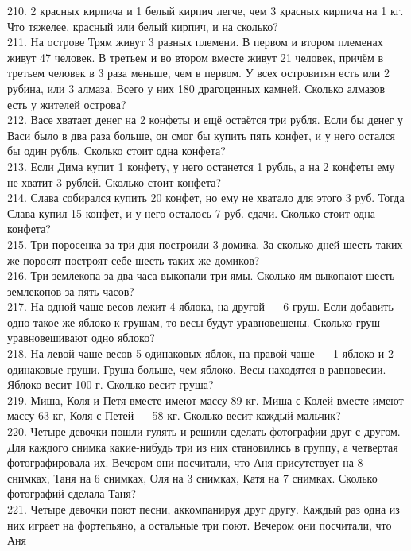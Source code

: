 \documentclass[12pt]{article}
\begin{document}
210. 2 красных кирпича и 1 белый кирпич легче, чем 3 красных кирпича на 1 кг. Что тяжелее, красный или белый кирпич, и на сколько?\\
211. На острове Трям живут 3 разных племени. В первом и втором племенах живут 47 человек. В третьем и во втором вместе живут 21 человек, причём в третьем человек в 3 раза меньше, чем в первом. У всех островитян есть или 2 рубина, или 3 алмаза. Всего у них 180 драгоценных камней. Сколько алмазов есть у жителей острова?\\
212. Васе хватает денег на 2 конфеты и ещё остаётся три рубля. Если бы денег у Васи было в два раза больше, он смог бы купить пять конфет, и у него остался бы один рубль. Сколько стоит одна конфета?\\
213. Если Дима купит 1 конфету, у него останется 1 рубль, а на 2 конфеты ему не хватит 3 рублей. Сколько стоит конфета?\\
214. Слава собирался купить 20 конфет, но ему не хватало для этого 3 руб. Тогда Слава купил 15 конфет, и у него осталось 7 руб. сдачи. Сколько стоит одна конфета?\\
215. Три поросенка за три дня построили 3 домика. За сколько дней шесть таких же поросят построят себе шесть таких же домиков?\\
216. Три землекопа за два часа выкопали три ямы. Сколько ям выкопают шесть землекопов за пять часов?\\
217. На одной чаше весов лежит 4 яблока, на другой --- 6 груш. Если добавить одно такое же яблоко к грушам, то весы будут уравновешены. Сколько груш уравновешивают одно яблоко?\\
218. На левой чаше весов 5 одинаковых яблок, на правой чаше --- 1 яблоко и 2 одинаковые груши. Груша больше, чем яблоко. Весы находятся в равновесии. Яблоко весит 100 г. Сколько весит груша?\\
219. Миша, Коля и Петя вместе имеют массу 89 кг. Миша с Колей вместе имеют массу 63 кг, Коля с Петей --- 58 кг. Сколько весит каждый мальчик?\\
220. Четыре девочки пошли гулять и решили сделать фотографии друг с другом. Для каждого снимка какие-нибудь три из них становились в группу, а четвертая фотографировала их. Вечером они посчитали, что Аня присутствует на 8 снимках, Таня на 6 снимках, Оля на 3 снимках, Катя на 7 снимках. Сколько фотографий сделала Таня?\\
221. Четыре девочки поют песни, аккомпанируя друг другу. Каждый раз одна из них играет на фортепьяно, а остальные три поют. Вечером они посчитали, что Аня
\end{document}
